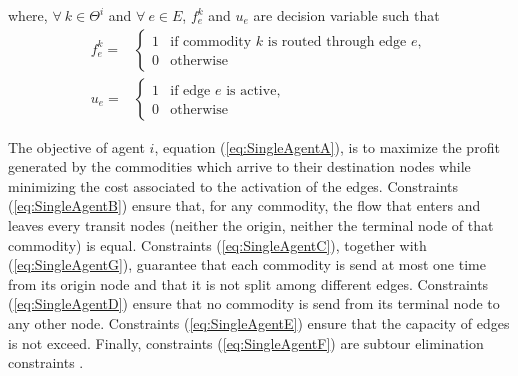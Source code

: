 \documentclass{article}
\begin{document}
where, $\forall\ k\in \Theta^i$ and  $\forall\ e \in E$, $f_e^k$ and $u_e$ are decision variable such that
\[
\begin{array}{rl}
f_e^k = & \begin{cases}
    1 & \text{if commodity } k \text{ is routed through edge } e,\\
    0 & \text{otherwise}
\end{cases}  \\[20pt]
u_e = &\begin{cases}
    1 & \text{if edge } e \text{ is active},\\
    0 & \text{otherwise}    
\end{cases}
\end{array}
\]

The objective of agent $i$, equation (\ref{eq:SingleAgentA}), is to maximize the
profit generated by the commodities which arrive to their destination nodes
while minimizing the cost associated to the activation of the edges. Constraints
(\ref{eq:SingleAgentB}) ensure that, for any commodity, the flow that enters
and leaves every transit nodes (neither the origin, neither the terminal node of
that commodity) is equal. Constraints (\ref{eq:SingleAgentC}), together with
(\ref{eq:SingleAgentG}), guarantee that each commodity is send at most one time
from its origin node and that it is not split among different edges. Constraints (\ref{eq:SingleAgentD}) ensure that no
commodity is send from its terminal node to any other node. Constraints (\ref{eq:SingleAgentE})
ensure that the capacity of edges is not exceed. Finally, constraints
(\ref{eq:SingleAgentF}) are subtour elimination constraints \parencite{AHUJA1993}. 

\end{document}
